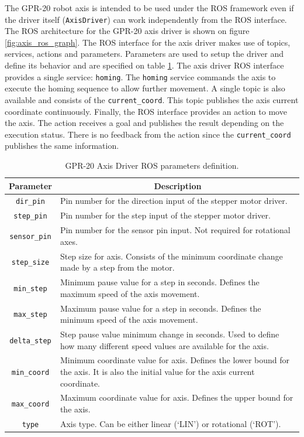 \documentclass{article}
\begin{document}
The GPR-20 robot axis is intended to be used under the ROS framework even if the driver itself (\texttt{AxisDriver}) can work independently from the ROS interface. The ROS architecture for the GPR-20 axis driver is shown on figure \ref{fig:axis_ros_graph}. The ROS interface for the axis driver makes use of topics, services, actions and parameters. Parameters are used to setup the driver and define its behavior and are specified on table \ref{tab:axis_ros_params}. The axis driver ROS interface provides a single service: \texttt{homing}. The \texttt{homing} service commands the axis to execute the homing sequence to allow further movement. A single topic is also available and consists of the \texttt{current\_coord}. This topic publishes the axis current coordinate continuously. Finally, the ROS interface provides an action to move the axis. The action receives a goal and publishes the result depending on the execution status. There is no feedback from the action since the \texttt{current\_coord} publishes the same information.

\begin{table}[H]
    \centering
    \begin{tabular}{|c|p{10cm}|}
        \hline
        \textbf{Parameter} & \multicolumn{1}{c|}{\textbf{Description}} \\ \hline
        \texttt{dir\_pin} & Pin number for the direction input of the stepper motor driver. \\ \hline
        \texttt{step\_pin} & Pin number for the step input of the stepper motor driver. \\ \hline
        \texttt{sensor\_pin} & Pin number for the sensor pin input. Not required for rotational axes. \\ \hline
        \texttt{step\_size} & Step size for axis. Consists of the minimum coordinate change made by a step from the motor. \\ \hline
        \texttt{min\_step} & Minimum pause value for a step in seconds. Defines the maximum speed of the axis movement. \\ \hline
        \texttt{max\_step} & Maximum pause value for a step in seconds. Defines the minimum speed of the axis movement. \\ \hline
        \texttt{delta\_step} & Step pause value minimum change in seconds. Used to define how many different speed values are available for the axis. \\ \hline
        \texttt{min\_coord} & Minimum coordinate value for axis. Defines the lower bound for the axis. It is also the initial value for the axis current coordinate. \\ \hline
        \texttt{max\_coord} & Maximum coordinate value for axis. Defines the upper bound for the axis. \\ \hline
        \texttt{type} & Axis type. Can be either linear (`LIN') or rotational (`ROT'). \\ \hline
    \end{tabular}
    \caption{GPR-20 Axis Driver ROS parameters definition.}
    \label{tab:axis_ros_params}
\end{table}
\end{document}

